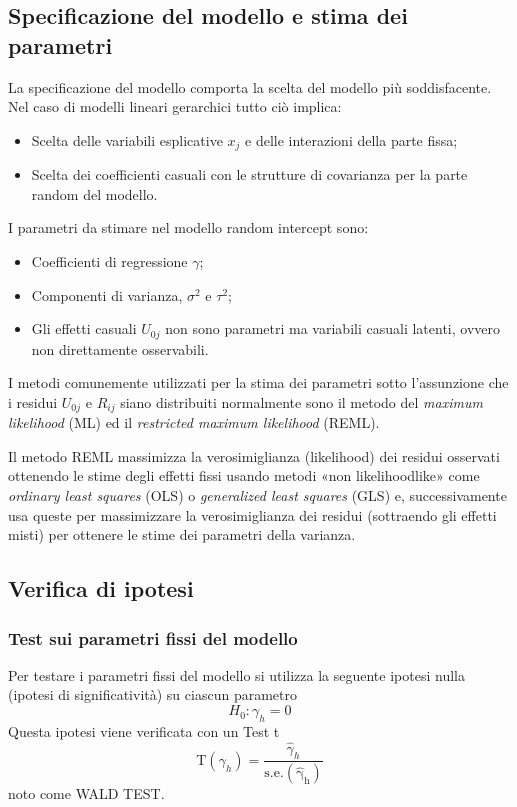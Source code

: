 \documentclass[a4page, 11pt]{article} %
\begin{document}
\subsection*{Specificazione del modello e stima dei parametri}
La specificazione del modello comporta la scelta del modello più soddisfacente. Nel caso di modelli lineari gerarchici tutto ciò implica:
\begin{itemize}
\item Scelta delle variabili esplicative $x_j$ e delle interazioni della parte fissa;
\item Scelta dei coefficienti casuali con le strutture di covarianza per la parte random del modello.
\end{itemize}
I parametri da stimare nel modello random intercept sono:
\begin{itemize}
\item Coefficienti di regressione $\gamma$;
\item Componenti di varianza, $\sigma^2$ e $\tau^2$; 
\item Gli effetti casuali $U_{0j}$ non sono parametri ma variabili casuali latenti, ovvero non direttamente osservabili. 
\end{itemize}
I metodi comunemente utilizzati per la stima dei parametri sotto l’assunzione che i residui $U_{0j}$ e $R_{ij}$ siano distribuiti normalmente sono il metodo del \textit{maximum likelihood} (ML) ed il \textit{restricted maximum likelihood} (REML).

Il metodo REML massimizza la verosimiglianza (likelihood) dei residui osservati ottenendo le stime degli effetti fissi usando metodi «non likelihoodlike» come \textit{ordinary least squares} (OLS) o \textit{generalized least squares} (GLS) e, successivamente usa queste per massimizzare la verosimiglianza dei residui (sottraendo gli effetti misti) per ottenere le stime dei parametri della varianza.
\subsection*{Verifica di ipotesi}
\subsubsection*{Test sui parametri fissi del modello}
Per testare i parametri fissi del modello si utilizza la seguente ipotesi nulla (ipotesi di significatività) su ciascun parametro 
\begin{equation*}
H_0: \gamma_h = 0
\end{equation*}
\newline
Questa ipotesi viene verificata con un Test t
\begin{equation*}
\mathrm{T}(\gamma_h) = \frac{\hat{\gamma}_h}{\mathrm{s.e.(\hat{\gamma}_h)}}
\end{equation*}
noto come WALD TEST. 
\end{document}
